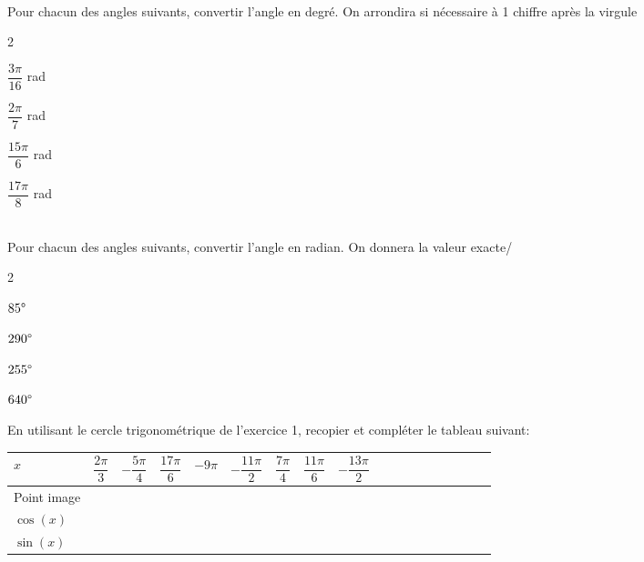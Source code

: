 \documentclass[11pt,a4paper]{article}  %
\begin{document}
\\
Pour chacun des angles suivants, convertir l'angle en degré. On arrondira si nécessaire à 1 chiffre après la virgule
\begin{multicols}{2}
	\begin{enumMet}
		\item $\dfrac{3\pi}{16}$ rad
		\item $\dfrac{2\pi}{7}$ rad
		\item $\dfrac{15\pi}{6}$ rad
		\item $\dfrac{17\pi}{8}$ rad
	\end{enumMet}
\end{multicols}

\\
Pour chacun des angles suivants, convertir l'angle en radian. On donnera la valeur exacte/
\begin{multicols}{2}
	\begin{enumMet}
		\item $85\degree$
		\item $290\degree$
		\item $255\degree$
		\item $640\degree$
	\end{enumMet}
\end{multicols}


En utilisant le cercle trigonométrique de l'exercice 1, recopier et compléter le tableau suivant:\\
\begin{tabular}{ | Xc | Xc | Xc | Xc | Xc | Xc | Xc | Xc | Xc |}
	\hline
	$x$  & $\dfrac{2\pi}{3}$ & $-\dfrac{5\pi}{4}$ & $\dfrac{17\pi}{6}$ &  $-9\pi$ & $-\dfrac{11\pi}{2}$ & $\dfrac{7\pi}{4}$ & $\dfrac{11\pi}{6}$ &  $-\dfrac{13\pi}{2}$\\ \hline
	Point image  &   &   &   &   &   & & & \\ \hline
	$\cos(x)$  &   &   &   &   &   & & & \\ \hline
	$\sin(x)$ &   &   &   &   &   & & & \\
	\hline  
\end{tabular}
\end{document}
